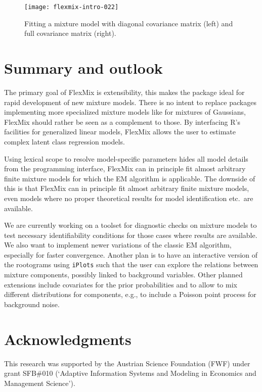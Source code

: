 \documentclass{jss}
\begin{document}
\begin{figure}[htbp]
  \centering
\texttt{[image: flexmix-intro-022]}
  \caption{Fitting a mixture model with diagonal covariance matrix (left) and full covariance matrix (right).}
  \label{fig:ell}
\end{figure}


\section{Summary and outlook}
\label{sec:summary}

The primary goal of FlexMix is extensibility, this makes the package
ideal for rapid development of new mixture models. There is no intent
to replace packages implementing more specialized mixture models like
 for mixtures of Gaussians, FlexMix should rather be
seen as a complement to those. By interfacing R's facilities for
generalized linear models, FlexMix allows the user to estimate complex
latent class regression models.

Using lexical scope to resolve model-specific parameters hides all
model details from the programming interface, FlexMix can in principle
fit almost arbitrary finite mixture models for which the EM algorithm
is applicable. The downside of this is that FlexMix can in principle
fit almost arbitrary finite mixture models, even models where no
proper theoretical results for model identification etc.\ are
available.

We are currently working on a toolset for diagnostic checks on mixture
models to test necessary identifiability conditions for those
cases where results are available. We also want to implement
newer variations of the classic EM algorithm, especially for faster
convergence. Another plan is to have an interactive version of the
rootograms using \texttt{iPlots} \citep{flm:Urbanek+Theus:2003} such
that the user can explore the relations between mixture components,
possibly linked to background variables. Other planned extensions
include covariates for the prior probabilities and to allow to mix
different distributions for components, e.g., to include a Poisson
point process for background noise.

\section*{Acknowledgments}

This research was supported by the Austrian Science Foundation (FWF)
under grant SFB\#010 (`Adaptive Information Systems and Modeling in
Economics and Management Science').


\end{document}
